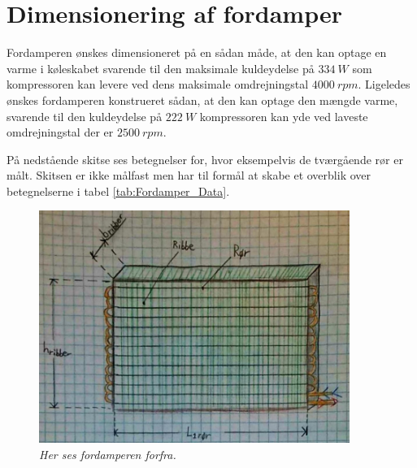 \documentclass[../Hovedrapport.tex]{subfiles}
\begin{document}
\section{Dimensionering af fordamper}
    \label{sec:dim_fordamper}

Fordamperen ønskes dimensioneret på en sådan måde, at den kan optage en varme i køleskabet svarende til den maksimale kuldeydelse på $\SI{334}{W}$ som kompressoren kan levere ved dens maksimale omdrejningstal $\SI{4000}{rpm}$. Ligeledes ønskes fordamperen konstrueret sådan, at den kan optage den mængde varme, svarende til den kuldeydelse på $\SI{222}{W}$ kompressoren kan yde ved laveste omdrejningstal der er $\SI{2500}{rpm}$.\citep{Coolselector_BD350GH}

På nedstående skitse ses betegnelser for, hvor eksempelvis de tværgående rør er målt. Skitsen er ikke målfast men har til formål at skabe et overblik over betegnelserne i tabel \ref{tab:Fordamper_Data}.

\begin{figure}[H] %
	\centering
	\includegraphics[width=0.9\textwidth]{Billeder/fordamper_forside.PNG}
	\caption{\textit{Her ses fordamperen forfra.}}
	\label{fig:fordamp_forside}
\end{figure}
\end{document}
